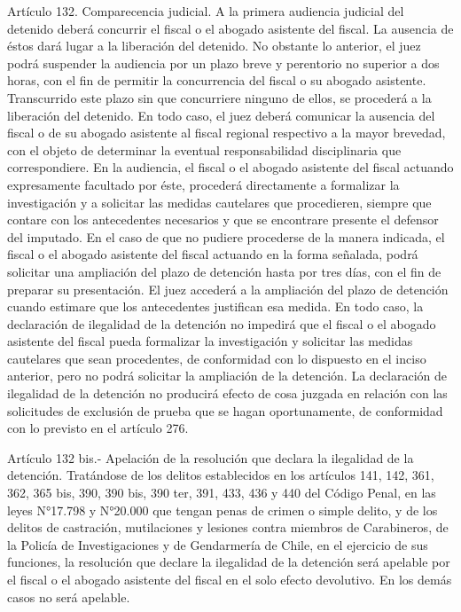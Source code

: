       Artículo 132. Comparecencia judicial. A la primera audiencia judicial del detenido deberá concurrir el fiscal o el abogado asistente del fiscal. La ausencia de éstos dará lugar a la liberación del detenido. No obstante lo anterior, el juez podrá suspender la audiencia por un plazo breve y perentorio no superior a dos horas, con el fin de permitir la concurrencia del fiscal o su abogado asistente. Transcurrido este plazo sin que concurriere ninguno de ellos, se procederá a la liberación del detenido.
    En todo caso, el juez deberá comunicar la ausencia del fiscal o de su abogado asistente al fiscal regional respectivo a la mayor brevedad, con el objeto de determinar la eventual responsabilidad disciplinaria que correspondiere.
    En la audiencia, el fiscal o el abogado asistente del fiscal actuando expresamente facultado por éste, procederá directamente a formalizar la investigación y a solicitar las medidas cautelares que procedieren, siempre que contare con los antecedentes necesarios y que se encontrare presente el defensor del imputado. En el caso de que no pudiere procederse de la manera indicada, el fiscal o el abogado asistente del fiscal actuando en la forma señalada, podrá solicitar una ampliación del plazo de detención hasta por tres días, con el fin de preparar su presentación. El juez accederá a la ampliación del plazo de detención cuando estimare que los antecedentes justifican esa medida.
    En todo caso, la declaración de ilegalidad de la detención no impedirá que el fiscal o el abogado asistente del fiscal pueda formalizar la investigación y solicitar las medidas cautelares que sean procedentes, de conformidad con lo dispuesto en el inciso anterior, pero no podrá solicitar la ampliación de la detención. La declaración de ilegalidad de la detención no producirá efecto de cosa juzgada en relación con las solicitudes de exclusión de prueba que se hagan oportunamente, de conformidad con lo previsto en el artículo 276.




    Artículo 132 bis.- Apelación de la resolución que declara la ilegalidad de la detención. Tratándose de los delitos establecidos en los artículos 141, 142, 361, 362, 365 bis, 390, 390 bis, 390 ter, 391, 433, 436 y 440 del Código Penal, en las leyes N°17.798 y N°20.000 que tengan penas de crimen o simple delito, y de los delitos de castración, mutilaciones y lesiones contra miembros de Carabineros, de la Policía de Investigaciones y de Gendarmería de Chile, en el ejercicio de sus funciones, la resolución que declare la ilegalidad de la detención será apelable por el fiscal o el abogado asistente del fiscal en el solo efecto devolutivo. En los demás casos no será apelable.

